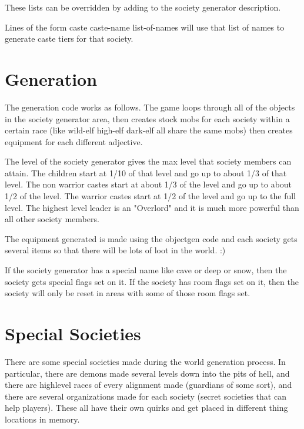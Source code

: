 These lists can be overridden by adding to the society generator 
description.

Lines of the form caste caste-name list-of-names will use that list
of names to generate caste tiers for that society. 

\section{Generation}

The generation code works as follows. The game loops through all of the
objects in the society generator area, then creates stock mobs for each
society within a certain race (like wild-elf high-elf dark-elf all
share the same mobs) then creates equipment for each different
adjective.

The level of the society generator gives the max level that society
members can attain. The children start at 1/10 of that level and
go up to about 1/3 of that level. The non warrior castes start at about
1/3 of the level and go up to about 1/2 of the level. The warrior
castes start at 1/2 of the level and go up to the full level. The highest
level leader is an "Overlord" and it is much more powerful than all other
society members.


The equipment generated is made using the objectgen code and each society
gets several items so that there will be lots of loot in the world. :)

If the society generator has a special name like cave or deep or snow, 
then the society gets special flags set on it. If the society has
room flags set on it, then the society will only be reset in areas
with some of those room flags set.

\section{Special Societies}

There are some special societies made during the world generation process. In
particular, there are demons made several levels down into the pits of hell,
and there are highlevel races of every alignment made (guardians of some
sort), and there are several organizations made for each society (secret
societies that can help players). These all have their  own quirks and get
placed in different thing locations in memory.

